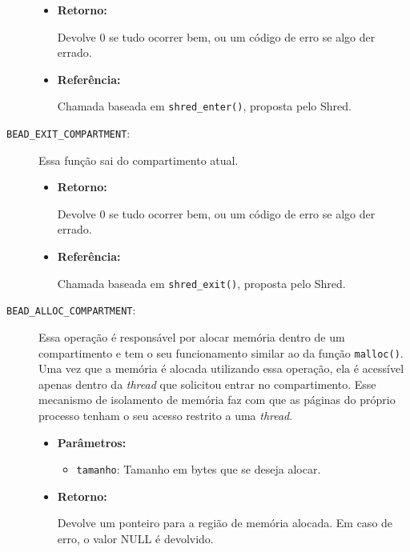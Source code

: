 \begin{description}
  \begin{itemize}
    \item \textbf{Retorno:}

Devolve 0 se tudo ocorrer bem, ou um código de erro se algo der errado.

    \item \textbf{Referência:}

Chamada baseada em \texttt{shred\_enter()}, proposta pelo Shred.

\end{itemize}

  \item [\texttt{BEAD\_EXIT\_COMPARTMENT}:]

Essa função sai do compartimento atual.

  \begin{itemize}

    \item \textbf{Retorno:}

Devolve 0 se tudo ocorrer bem, ou um código de erro se algo der errado.

    \item \textbf{Referência:}

Chamada baseada em \texttt{shred\_exit()}, proposta pelo Shred.

	\end{itemize}

  \item [\texttt{BEAD\_ALLOC\_COMPARTMENT}:]

Essa operação é responsável por alocar memória dentro de um compartimento e tem
o seu funcionamento similar ao da função \texttt{malloc()}. Uma vez que a
memória é alocada utilizando essa operação, ela é acessível
apenas dentro da \emph{thread} que solicitou entrar no compartimento. Esse mecanismo
de isolamento de memória faz com que as páginas do próprio processo tenham o
seu acesso restrito a uma \emph{thread}.

  \begin{itemize}
    \item \textbf{Parâmetros:}

    \begin{itemize}
      \item \texttt{tamanho}: Tamanho em bytes que se deseja alocar.
    \end{itemize}

    \item \textbf{Retorno:}

Devolve um ponteiro para a região de memória alocada. Em caso de erro, o valor
NULL é devolvido.


\end{itemize}
\end{description}
